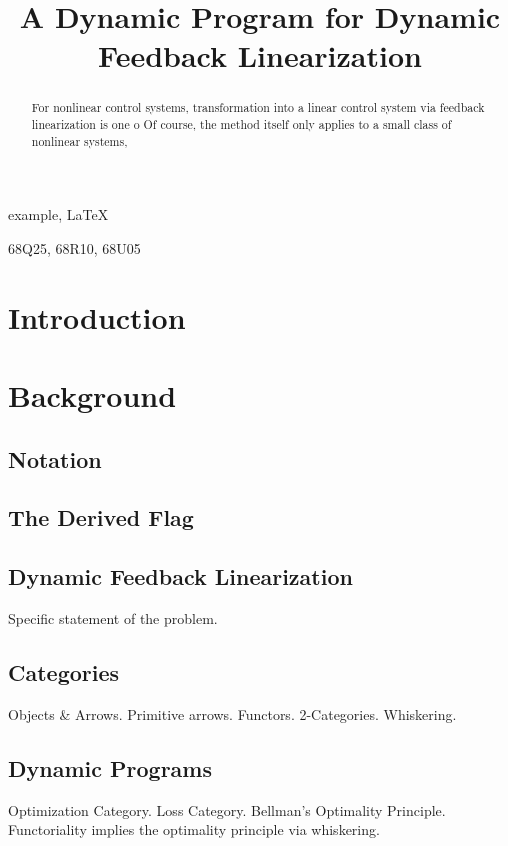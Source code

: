 \documentclass[review,hidelinks,onefignum,onetabnum]{siamart251216}
\begin{document}
\title{A Dynamic Program for Dynamic Feedback Linearization}

\maketitle

\begin{abstract}
  For nonlinear control systems, transformation into a linear control system via feedback linearization is one o
  Of course, the method itself only applies to a small class of nonlinear systems, 
\end{abstract}

\begin{keywords}
example, \LaTeX
\end{keywords}

\begin{MSCcodes}
68Q25, 68R10, 68U05
\end{MSCcodes}

\section{Introduction}

\section{Background}

\subsection{Notation}

\subsection{The Derived Flag}

\subsection{Dynamic Feedback Linearization}
Specific statement of the problem.

\subsection{Categories}
Objects \& Arrows. Primitive arrows. Functors. 2-Categories. Whiskering.

\subsection{Dynamic Programs}
Optimization Category. Loss Category. Bellman's Optimality Principle. Functoriality implies the optimality principle via whiskering.
\end{document}
